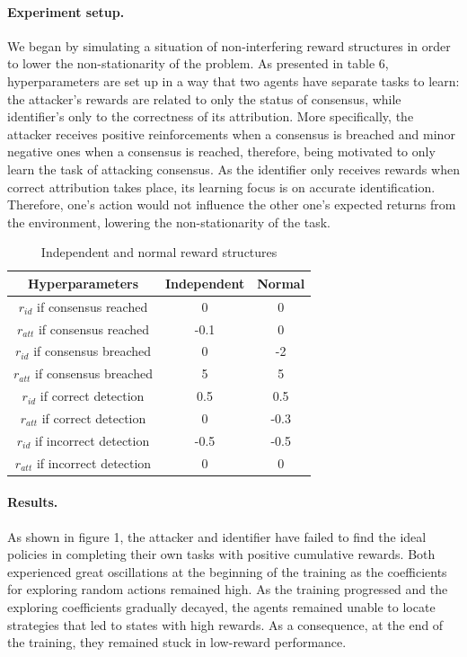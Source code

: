 \documentclass[a4paper,11pt]{article}
\begin{document}
\paragraph{Experiment setup.}
We began by simulating a situation of non-interfering reward structures in order to lower the non-stationarity of the problem. As presented in table 6, hyperparameters are set up in a way that two agents have separate tasks to learn: the attacker's rewards are related to only the status of consensus, while identifier's only to the correctness of its attribution. More specifically, the attacker receives positive reinforcements when a consensus is breached and minor negative ones when a consensus is reached, therefore, being motivated to only learn the task of attacking consensus. As the identifier only receives rewards when correct attribution takes place, its learning focus is on accurate identification. Therefore, one's action would not influence the other one's expected returns from the environment, lowering the non-stationarity of the task.
\begin{table}[h!]
    \centering
     \begin{tabular}{||c c c||}
     \hline
     Hyperparameters & Independent & Normal\\ [0.5ex]
     \hline\hline
     $r_{id}$ if consensus reached & 0  & 0\\
     $r_{att}$ if consensus reached & -0.1 & 0\\
     $r_{id}$ if consensus breached & 0 & -2\\
      $r_{att}$ if consensus breached & 5 & 5\\
     $r_{id}$ if correct detection & 0.5 & 0.5\\
      $r_{att}$ if correct detection & 0 & -0.3\\
     $r_{id}$ if incorrect detection & -0.5 & -0.5\\
      $r_{att}$ if incorrect detection & 0 & 0\\
     [1ex]
     \hline
     \end{tabular}
     \caption{Independent and normal reward structures}
     \label{tab:Notations}
\end{table}

\paragraph{Results.} As shown in figure 1, the attacker and identifier have failed to find the ideal policies in completing their own tasks with positive cumulative rewards. Both experienced great oscillations at the beginning of the training as the coefficients for exploring random actions remained high. As the training progressed and the exploring coefficients gradually decayed, the agents remained unable to locate strategies that led to states with high rewards. As a consequence, at the end of the training, they remained stuck in low-reward performance.
\end{document}
